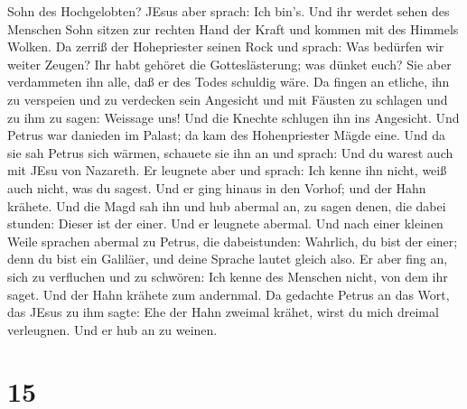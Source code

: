 Sohn des Hochgelobten?  JEsus aber sprach: Ich bin's. Und
ihr werdet sehen des Menschen Sohn sitzen zur rechten Hand der Kraft und
kommen mit des Himmels Wolken.  Da zerriß der Hohepriester
seinen Rock und sprach: Was bedürfen wir weiter Zeugen? 
Ihr habt gehöret die Gotteslästerung; was dünket euch? Sie aber
verdammeten ihn alle, daß er des Todes schuldig wäre.  Da
fingen an etliche, ihn zu verspeien und zu verdecken sein Angesicht und
mit Fäusten zu schlagen und zu ihm zu sagen: Weissage uns! Und die
Knechte schlugen ihn ins Angesicht.  Und Petrus war
danieden im Palast; da kam des Hohenpriester Mägde eine. 
Und da sie sah Petrus sich wärmen, schauete sie ihn an und sprach: Und
du warest auch mit JEsu von Nazareth.  Er leugnete aber und
sprach: Ich kenne ihn nicht, weiß auch nicht, was du sagest. Und er ging
hinaus in den Vorhof; und der Hahn krähete.  Und die Magd
sah ihn und hub abermal an, zu sagen denen, die dabei stunden: Dieser
ist der einer.  Und er leugnete abermal. Und nach einer
kleinen Weile sprachen abermal zu Petrus, die dabeistunden: Wahrlich, du
bist der einer; denn du bist ein Galiläer, und deine Sprache lautet
gleich also.  Er aber fing an, sich zu verfluchen und zu
schwören: Ich kenne des Menschen nicht, von dem ihr saget. 
Und der Hahn krähete zum andernmal. Da gedachte Petrus an das Wort, das
JEsus zu ihm sagte: Ehe der Hahn zweimal krähet, wirst du mich dreimal
verleugnen. Und er hub an zu weinen.

\hypertarget{section-14}{%
\section{15}\label{section-14}}

